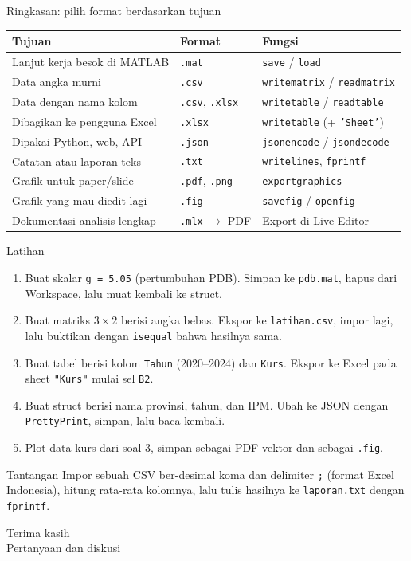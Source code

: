 \documentclass[10pt,aspectratio=169]{beamer}
\newcommand{\kode}[1]{\texttt{\small #1}}
\begin{document}
\begin{frame}{Ringkasan: pilih format berdasarkan tujuan}
  \centering\small
  \begin{tabular}{l l l}
    \toprule
    \textbf{Tujuan} & \textbf{Format} & \textbf{Fungsi} \\
    \midrule
    Lanjut kerja besok di MATLAB        & \kode{.mat}  & \kode{save} / \kode{load} \\
    Data angka murni                    & \kode{.csv}  & \kode{writematrix} / \kode{readmatrix} \\
    Data dengan nama kolom              & \kode{.csv}, \kode{.xlsx} & \kode{writetable} / \kode{readtable} \\
    Dibagikan ke pengguna Excel         & \kode{.xlsx} & \kode{writetable} (+ \kode{'Sheet'}) \\
    Dipakai Python, web, API            & \kode{.json} & \kode{jsonencode} / \kode{jsondecode} \\
    Catatan atau laporan teks           & \kode{.txt}  & \kode{writelines}, \kode{fprintf} \\
    Grafik untuk paper/slide            & \kode{.pdf}, \kode{.png} & \kode{exportgraphics} \\
    Grafik yang mau diedit lagi         & \kode{.fig}  & \kode{savefig} / \kode{openfig} \\
    Dokumentasi analisis lengkap        & \kode{.mlx} $\rightarrow$ PDF & Export di Live Editor \\
    \bottomrule
  \end{tabular}
\end{frame}

\begin{frame}{Latihan}
  \begin{enumerate}
    \item Buat skalar \kode{g = 5.05} (pertumbuhan PDB). Simpan ke \kode{pdb.mat}, hapus dari Workspace, lalu muat kembali ke struct.
    \item Buat matriks $3\times 2$ berisi angka bebas. Ekspor ke \kode{latihan.csv}, impor lagi, lalu buktikan dengan \kode{isequal} bahwa hasilnya sama.
    \item Buat tabel berisi kolom \kode{Tahun} (2020--2024) dan \kode{Kurs}. Ekspor ke Excel pada sheet \kode{"Kurs"} mulai sel \kode{B2}.
    \item Buat struct berisi nama provinsi, tahun, dan IPM. Ubah ke JSON dengan \kode{PrettyPrint}, simpan, lalu baca kembali.
    \item Plot data kurs dari soal 3, simpan sebagai PDF vektor dan sebagai \kode{.fig}.
  \end{enumerate}
  \vspace{0.5em}
  \begin{exampleblock}{Tantangan}
    Impor sebuah CSV ber-desimal koma dan delimiter \kode{;} (format Excel Indonesia), hitung rata-rata kolomnya,
    lalu tulis hasilnya ke \kode{laporan.txt} dengan \kode{fprintf}.
  \end{exampleblock}
\end{frame}

\begin{frame}[standout]
  Terima kasih \\[0.5em]
  \normalsize Pertanyaan dan diskusi
\end{frame}
\end{document}
